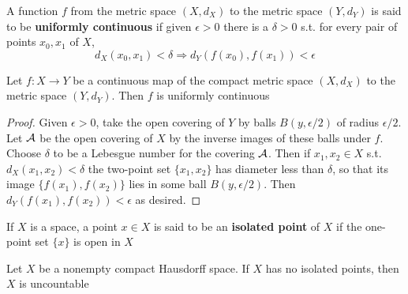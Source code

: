 \documentclass[11pt]{article}
\begin{document}
\begin{definition}[]
A function \(f\) from the metric space \((X,d_X)\) to the metric space \((Y,d_Y)\) is said to be
\textbf{uniformly continuous} if given \(\epsilon>0\) there is a \(\delta>0\) s.t. for every pair of points \(x_0,x_1\)
of \(X\),
\begin{equation*}
d_X(x_0,x_1)<\delta\Longrightarrow d_Y(f(x_0),f(x_1))<\epsilon
\end{equation*}
\end{definition}

\begin{theorem}
Let \(f:X\to Y\) be a continuous map of the compact metric space \((X,d_X)\) to the metric
space \((Y,d_Y)\). Then \(f\) is uniformly continuous
\end{theorem}

\begin{proof}
Given \(\epsilon>0\), take the open covering of \(Y\) by balls \(B(y,\epsilon/2)\) of radius \(\epsilon/2\). Let \(\mathcal{A}\)
be the open covering of \(X\) by the inverse images of these balls under \(f\). Choose \(\delta\) to be a
Lebesgue number for the covering \(\mathcal{A}\). Then if \(x_1,x_2\in X\) s.t. \(d_X(x_1,x_2)<\delta\) the two-point
set \(\{x_1,x_2\}\) has diameter less than \(\delta\), so that its image \(\{f(x_1),f(x_2)\}\) lies in some
ball \(B(y,\epsilon/2)\). Then \(d_Y(f(x_1),f(x_2))<\epsilon\) as desired.
\end{proof}

\begin{definition}[]
If \(X\) is a space, a point \(x\in X\) is said to be an \textbf{isolated point} of \(X\) if the one-point
set \(\{x\}\) is open in \(X\)
\end{definition}

\begin{theorem}[]
Let \(X\) be a nonempty compact Hausdorff space. If \(X\) has no isolated points, then \(X\) is uncountable
\end{theorem}
\end{document}
